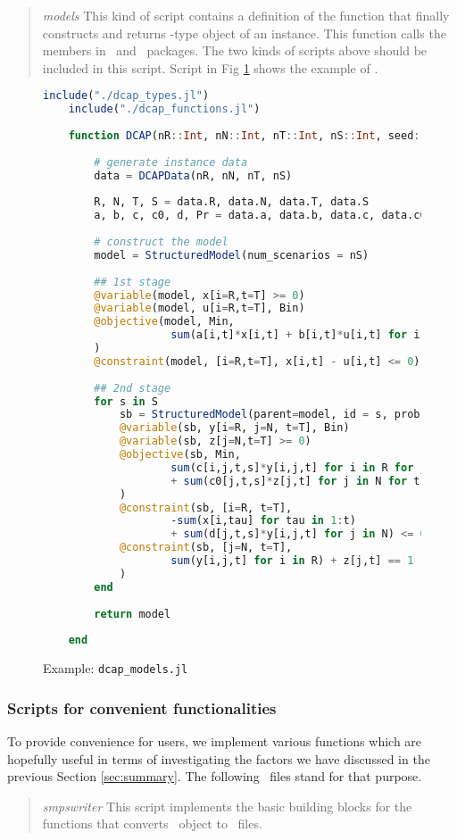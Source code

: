 \begin{quote}
\noindent\textit{models} This kind of script contains a definition of the function that finally constructs and returns \jumpmodel-type object of an instance. This function calls the members in \jump\ and \structjump\ packages. The two kinds of scripts above should be included in this script. Script in Fig \ref{fig:dcap_models} shows the example of \dcap.
\end{quote}
\begin{figure}[]
	\centering
	\begin{lstlisting}[frame=single,language=julia]
	include("./dcap_types.jl")
	include("./dcap_functions.jl")
	
	function DCAP(nR::Int, nN::Int, nT::Int, nS::Int, seed::Int)::JuMP.Model
	
		# generate instance data
		data = DCAPData(nR, nN, nT, nS)
		
		R, N, T, S = data.R, data.N, data.T, data.S
		a, b, c, c0, d, Pr = data.a, data.b, data.c, data.c0, data.d, data.Pr
		
		# construct the model
		model = StructuredModel(num_scenarios = nS)
		
		## 1st stage
		@variable(model, x[i=R,t=T] >= 0)
		@variable(model, u[i=R,t=T], Bin)
		@objective(model, Min, 
					sum(a[i,t]*x[i,t] + b[i,t]*u[i,t] for i in R for t in T)
		)
		@constraint(model, [i=R,t=T], x[i,t] - u[i,t] <= 0)
		
		## 2nd stage
		for s in S
			sb = StructuredModel(parent=model, id = s, prob = Pr[s])
			@variable(sb, y[i=R, j=N, t=T], Bin)
			@variable(sb, z[j=N,t=T] >= 0)
			@objective(sb, Min, 
					sum(c[i,j,t,s]*y[i,j,t] for i in R for j in N for t in T) 
					+ sum(c0[j,t,s]*z[j,t] for j in N for t in T)
			)
			@constraint(sb, [i=R, t=T], 
					-sum(x[i,tau] for tau in 1:t) 
					+ sum(d[j,t,s]*y[i,j,t] for j in N) <= 0)
			@constraint(sb, [j=N, t=T], 
					sum(y[i,j,t] for i in R) + z[j,t] == 1
			)
		end
	
		return model
		
	end
	\end{lstlisting}
	\caption{Example: \texttt{dcap\_models.jl}}\label{fig:dcap_models}
\end{figure}

\subsubsection{Scripts for convenient functionalities}
To provide convenience for users, we implement various functions which are hopefully useful in terms of investigating the factors we have discussed in the previous Section \ref{sec:summary}. The following \julia\ files stand for that purpose.
\begin{quotation}
	\noindent\textit{smpswriter} This script implements the basic building blocks for the functions that converts \jumpmodel\ object to \smps\ files. 
\end{quotation}


